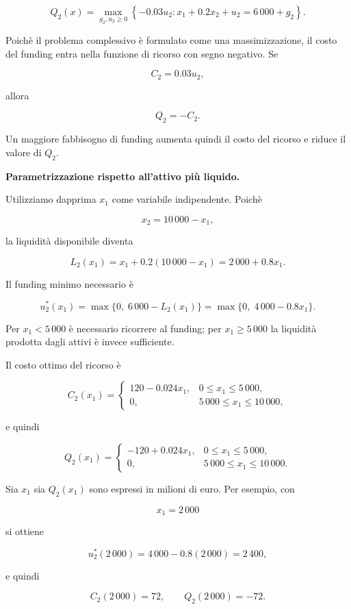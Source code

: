 \[
Q_2(x)
=
\max_{g_2,u_2\geq0}
\left\{
-0.03u_2:
x_1+0.2x_2+u_2=6\,000+g_2
\right\}.
\]

Poich\`e il problema complessivo \`e formulato come una massimizzazione, il
costo del funding entra nella funzione di ricorso con segno negativo. Se

\[
C_2=0.03u_2,
\]

allora

\[
Q_2=-C_2.
\]

Un maggiore fabbisogno di funding aumenta quindi il costo del ricorso e
riduce il valore di $Q_2$.

\medskip

\noindent
\textbf{Parametrizzazione rispetto all'attivo pi\`u liquido.}

Utilizziamo dapprima $x_1$ come variabile indipendente. Poich\`e

\[
x_2=10\,000-x_1,
\]

la liquidit\`a disponibile diventa

\[
L_2(x_1)
=
x_1+0.2(10\,000-x_1)
=
2\,000+0.8x_1.
\]

Il funding minimo necessario \`e

\[
u_2^*(x_1)
=
\max\{0,\;6\,000-L_2(x_1)\}
=
\max\{0,\;4\,000-0.8x_1\}.
\]

Per $x_1<5\,000$ \`e necessario ricorrere al funding; per
$x_1\geq5\,000$ la liquidit\`a prodotta dagli attivi \`e invece sufficiente.

Il costo ottimo del ricorso \`e

\[
C_2(x_1)
=
\begin{cases}
120-0.024x_1, & 0\leq x_1\leq5\,000,\\[4pt]
0, & 5\,000\leq x_1\leq10\,000,
\end{cases}
\]

e quindi

\[
Q_2(x_1)
=
\begin{cases}
-120+0.024x_1, & 0\leq x_1\leq5\,000,\\[4pt]
0, & 5\,000\leq x_1\leq10\,000.
\end{cases}
\]

Sia $x_1$ sia $Q_2(x_1)$ sono espressi in milioni di euro. Per esempio, con

\[
x_1=2\,000
\]

si ottiene

\[
u_2^*(2\,000)
=
4\,000-0.8(2\,000)
=
2\,400,
\]

e quindi

\[
C_2(2\,000)=72,
\qquad
Q_2(2\,000)=-72.
\]

